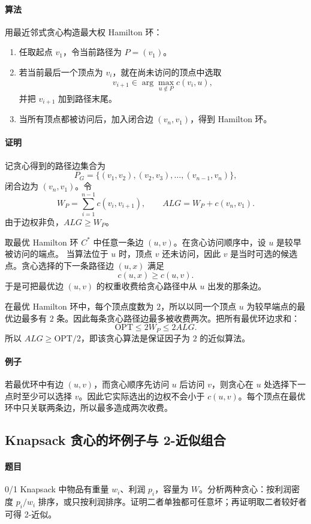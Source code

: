 \documentclass[UTF8,openany,12pt]{ctexbook}
\theoremstyle{remark}
\newcommand{\OPT}{\mathrm{OPT}}
\begin{document}
\paragraph{算法}
用最近邻式贪心构造最大权 Hamilton 环：
\begin{enumerate}
  \item 任取起点 $v_1$，令当前路径为 $P=(v_1)$。
  \item 若当前最后一个顶点为 $v_i$，就在尚未访问的顶点中选取
  \[
    v_{i+1}\in \arg\max_{u\notin P} c(v_i,u),
  \]
  并把 $v_{i+1}$ 加到路径末尾。
  \item 当所有顶点都被访问后，加入闭合边 $(v_n,v_1)$，得到 Hamilton 环。
\end{enumerate}

\paragraph{证明}
记贪心得到的路径边集合为
\[
  P_G=\{(v_1,v_2),(v_2,v_3),\dots,(v_{n-1},v_n)\},
\]
闭合边为 $(v_n,v_1)$。令
\[
  W_P=\sum_{i=1}^{n-1}c(v_i,v_{i+1}),\qquad
  ALG=W_P+c(v_n,v_1).
\]
由于边权非负，$ALG\ge W_P$。

取最优 Hamilton 环 $C^*$ 中任意一条边 $(u,v)$。在贪心访问顺序中，设 $u$ 是较早被访问的端点。
当算法位于 $u$ 时，顶点 $v$ 还未访问，因此 $v$ 是当时可选的候选点。贪心选择的下一条路径边
$(u,x)$ 满足
\[
  c(u,x)\ge c(u,v).
\]
于是可把最优边 $(u,v)$ 的权重收费给贪心路径中从 $u$ 出发的那条边。

在最优 Hamilton 环中，每个顶点度数为 $2$，所以以同一个顶点 $u$ 为较早端点的最优边最多有
$2$ 条。因此每条贪心路径边最多被收费两次。把所有最优环边求和：
\[
  \OPT\le 2W_P\le 2ALG.
\]
所以 $ALG\ge \OPT/2$，即该贪心算法是保证因子为 $2$ 的近似算法。

\paragraph{例子}
若最优环中有边 $(u,v)$，而贪心顺序先访问 $u$ 后访问 $v$，则贪心在 $u$ 处选择下一点时至少可以选择 $v$。因此它实际选出的边权不会小于 $c(u,v)$。每个顶点在最优环中只关联两条边，所以最多造成两次收费。

\subsection{Knapsack 贪心的坏例子与 2-近似组合}

\paragraph{题目}
0/1 Knapsack 中物品有重量 $w_i$、利润 $p_i$，容量为 $W$。分析两种贪心：按利润密度
$p_i/w_i$ 排序，或只按利润排序。证明二者单独都可任意坏；再证明取二者较好者可得
2-近似。
\end{document}
